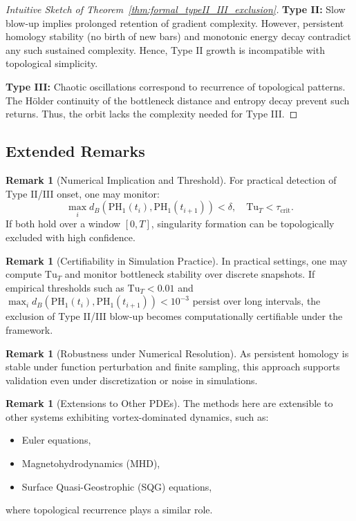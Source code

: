 \documentclass[11pt]{article}
\theoremstyle{definition}
\newtheorem{remark}[theorem]{Remark}
\begin{document}
\begin{proof}[Intuitive Sketch of Theorem~\ref{thm:formal_typeII_III_exclusion}]
\textbf{Type II:} Slow blow-up implies prolonged retention of gradient complexity. However, persistent homology stability (no birth of new bars) and monotonic energy decay contradict any such sustained complexity. Hence, Type II growth is incompatible with topological simplicity.

\textbf{Type III:} Chaotic oscillations correspond to recurrence of topological patterns. The Hölder continuity of the bottleneck distance and entropy decay prevent such returns. Thus, the orbit lacks the complexity needed for Type III.
\end{proof}

\subsection*{Extended Remarks}

\begin{remark}[Numerical Implication and Threshold]
For practical detection of Type II/III onset, one may monitor:
\[
\max_{i} d_B(\mathrm{PH}_1(t_i), \mathrm{PH}_1(t_{i+1})) < \delta, \quad \mathrm{Tu}_T < \tau_{\text{crit}}.
\]
If both hold over a window $[0,T]$, singularity formation can be topologically excluded with high confidence.
\end{remark}

\begin{remark}[Certifiability in Simulation Practice]
In practical settings, one may compute $\mathrm{Tu}_T$ and monitor bottleneck stability over discrete snapshots. If empirical thresholds such as $\mathrm{Tu}_T < 0.01$ and $\max_i d_B(\mathrm{PH}_1(t_i), \mathrm{PH}_1(t_{i+1})) < 10^{-3}$ persist over long intervals, the exclusion of Type II/III blow-up becomes computationally certifiable under the framework.
\end{remark}

\begin{remark}[Robustness under Numerical Resolution]
As persistent homology is stable under function perturbation and finite sampling, this approach supports validation even under discretization or noise in simulations.
\end{remark}

\begin{remark}[Extensions to Other PDEs]
The methods here are extensible to other systems exhibiting vortex-dominated dynamics, such as:
\begin{itemize}
  \item Euler equations,
  \item Magnetohydrodynamics (MHD),
  \item Surface Quasi-Geostrophic (SQG) equations,
\end{itemize}
where topological recurrence plays a similar role.
\end{remark}
\end{document}
